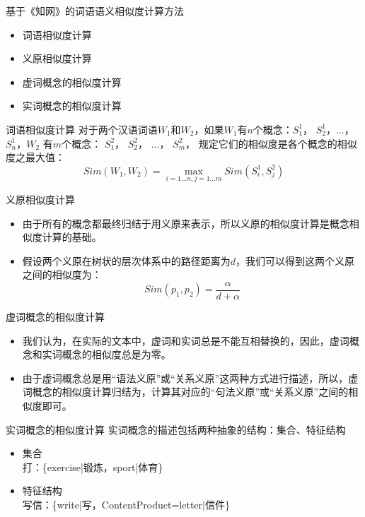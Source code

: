 \documentclass[aspectratio=169]{beamer} %
\begin{document}
    \begin{frame}{基于《知网》的词语语义相似度计算方法}
      \begin{itemize}
        \item 词语相似度计算
        \item 义原相似度计算
        \item 虚词概念的相似度计算
        \item 实词概念的相似度计算
      \end{itemize}
    \end{frame}

    \begin{frame}{词语相似度计算}
      对于两个汉语词语$W_1$和$W_2$，如果$W_1$有$n$个概念：$S_1^1$， $S_2^1$，...， $S_n^1$，$W_2$ 有$m$个概念： $S_1^2$， $S_2^2$， ...， $S_m^2$， 规定它们的相似度是各个概念的相似度之最大值：
      \begin{equation}
        Sim(W_1, W_2) = \max_{i=1...n, j=1...m}{Sim(S_i^1, S_j^2)}
      \end{equation}
    \end{frame}

    \begin{frame}{义原相似度计算}
      \begin{itemize}
        \item 由于所有的概念都最终归结于用义原来表示，所以义原的相似度计算是概念相似度计算的基础。
        \item 假设两个义原在树状的层次体系中的路径距离为$d$，我们可以得到这两个义原之间的相似度为：
        \begin{equation}
          Sim(p_1, p_2) = \frac{\alpha}{d + \alpha}
        \end{equation}
      \end{itemize}
    \end{frame}

    \begin{frame}{虚词概念的相似度计算}
      \begin{itemize}
        \item 我们认为，在实际的文本中，虚词和实词总是不能互相替换的，因此，虚词概念和实词概念的相似度总是为零。
        \item 由于虚词概念总是用“语法义原”或“关系义原”这两种方式进行描述，所以，虚词概念的相似度计算归结为，计算其对应的“句法义原”或“关系义原”之间的相似度即可。
      \end{itemize}
    \end{frame}

    \begin{frame}{实词概念的相似度计算}
      实词概念的描述包括两种抽象的结构：集合、特征结构
      \begin{itemize}
        \item 集合 \\
          打：\{exercise|锻炼，sport|体育\}
        \item 特征结构 \\
          写信：\{write|写，ContentProduct=letter|信件\}
      \end{itemize}
    \end{frame}
\end{document}
